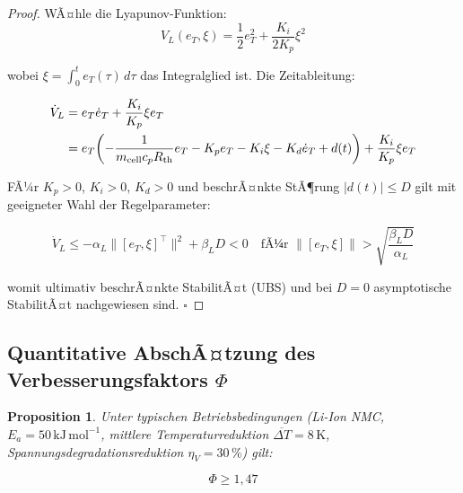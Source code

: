 ﻿\documentclass[12pt,a4paper]{article}
\newtheorem{proposition}[theorem]{Proposition}
\begin{document}
	\begin{proof}
		WÃ¤hle die Lyapunov-Funktion:
		\begin{equation}
			V_L(e_T, \xi) = \frac{1}{2}e_T^2 + \frac{K_i}{2K_p}\xi^2
		\end{equation}
		
		wobei $\xi = \int_0^t e_T(\tau)\,d\tau$ das Integralglied ist. Die Zeitableitung:
		
		\begin{align}
			\dot{V}_L &= e_T \dot{e}_T + \frac{K_i}{K_p}\xi e_T \notag\\
			&= e_T\!\left(-\frac{1}{m_\mathrm{cell}c_p R_\mathrm{th}} e_T
			- K_p e_T - K_i \xi - K_d \dot{e}_T + d(t)\right) + \frac{K_i}{K_p}\xi e_T
		\end{align}
		
		FÃ¼r $K_p > 0$, $K_i > 0$, $K_d > 0$ und beschrÃ¤nkte StÃ¶rung $|d(t)| \leq D$
		gilt mit geeigneter Wahl der Regelparameter:
		
		\begin{equation}
			\dot{V}_L \leq -\alpha_L \|[e_T, \xi]^\top\|^2 + \beta_L D < 0
			\quad \text{fÃ¼r } \|[e_T, \xi]\| > \sqrt{\frac{\beta_L D}{\alpha_L}}
		\end{equation}
		
		womit ultimativ beschrÃ¤nkte StabilitÃ¤t (UBS) und bei $D = 0$ asymptotische
		StabilitÃ¤t nachgewiesen sind. \hfill$\square$
	\end{proof}
	
	\subsection{Quantitative AbschÃ¤tzung des Verbesserungsfaktors $\Phi$}
	
	\begin{proposition}
		\label{prop:phi_bound}
		Unter typischen Betriebsbedingungen (Li-Ion NMC, $E_a = 50\,\mathrm{kJ\,mol^{-1}}$,
		mittlere Temperaturreduktion $\overline{\Delta T} = 8\,\mathrm{K}$,
		Spannungsdegradationsreduktion $\eta_V = 30\,\%$) gilt:
		
		\begin{equation}
			\Phi \geq 1{,}47
		\end{equation}
	\end{proposition}
	
\end{document}
